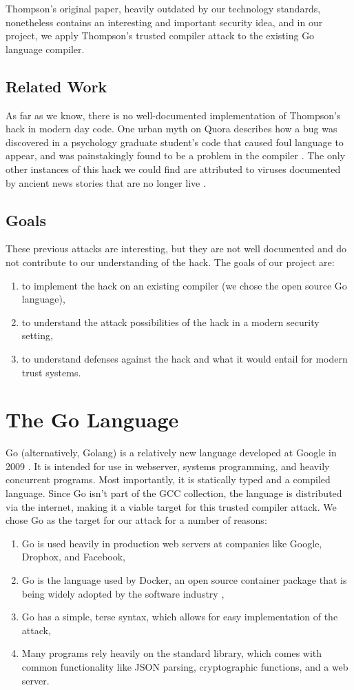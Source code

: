 \documentclass[10pt]{sigplanconf}
\begin{document}
Thompson's original paper, heavily outdated by our technology standards, nonetheless contains an interesting and important security idea, and in our project, we apply Thompson's trusted compiler attack to the existing Go language compiler.

\subsection{Related Work}
As far as we know, there is no well-documented implementation of Thompson's hack in modern day code. One urban myth on Quora describes how a bug was discovered in a psychology graduate student's code that caused foul language to appear, and was painstakingly found to be a problem in the compiler \cite{quora}. The only other instances of this hack we could find are attributed to viruses documented by ancient news stories that are no longer live \cite{deadlink}. %

\subsection{Goals}
These previous attacks are interesting, but they are not well documented and do not contribute to our understanding of the hack. The goals of our project are:
\begin{enumerate}
\item to implement the hack on an existing compiler (we chose the open source Go language),
\item to understand the attack possibilities of the hack in a modern security setting,
\item to understand defenses against the hack and what it would entail for modern trust systems.
\end{enumerate}

\section{The Go Language}
Go (alternatively, Golang) is a relatively new language developed at Google in 2009 \cite{golang}. It is intended for use in webserver, systems programming, and heavily concurrent programs. Most importantly, it is statically typed and a compiled language. Since Go isn't part of the GCC collection, the language is distributed via the internet, making it a viable target for this trusted compiler attack. We chose Go as the target for our attack for a number of reasons:
\begin{enumerate}
\item Go is used heavily in production web servers at companies like Google, Dropbox, and Facebook,
\item Go is the language used by Docker, an open source container package that is being widely adopted by the software industry \cite{docker},
\item Go has a simple, terse syntax, which allows for easy implementation of the attack,
\item Many programs rely heavily on the standard library, which comes with common functionality like JSON parsing, cryptographic functions, and a web server.
\end{enumerate}
\end{document}
